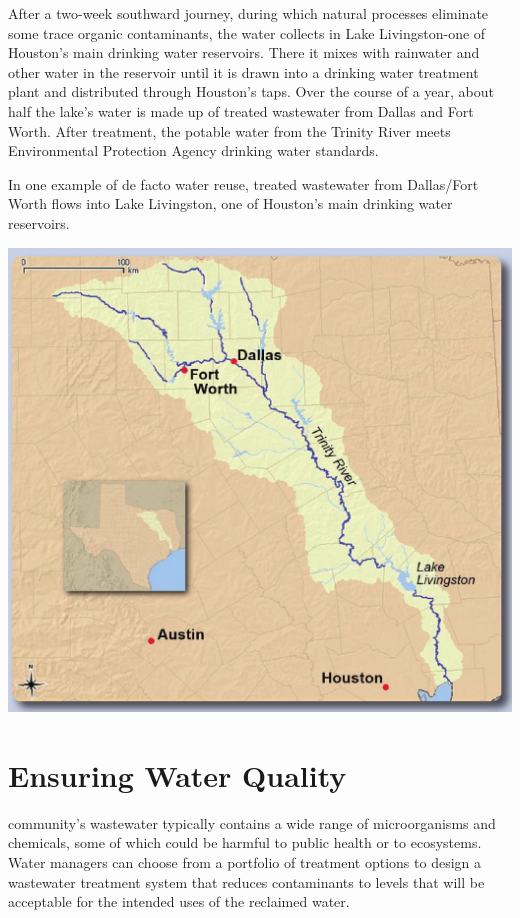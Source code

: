 \documentclass[10pt]{article}
\begin{document}
After a two-week southward journey, during which natural processes eliminate some trace organic contaminants, the water collects in Lake Livingston-one of Houston's main drinking water reservoirs. There it mixes with rainwater and other water in the reservoir until it is drawn into a drinking water treatment plant and distributed through Houston's taps. Over the course of a year, about half the lake's water is made up of treated wastewater from Dallas and Fort Worth. After treatment, the potable water from the Trinity River meets Environmental Protection Agency drinking water standards.

In one example of de facto water reuse, treated wastewater from Dallas/Fort Worth flows into Lake Livingston, one of Houston's main drinking water reservoirs.

\includegraphics[max width=\textwidth]{2022_11_05_93277ca2de7ec5580550g-05}

\section{Ensuring Water Quality}
community's wastewater typically contains a wide range of microorganisms and chemicals, some of which could be harmful to public health or to ecosystems. Water managers can choose from a portfolio of treatment options to design a wastewater treatment system that reduces contaminants to levels that will be acceptable for the intended uses of the reclaimed water.
\end{document}
